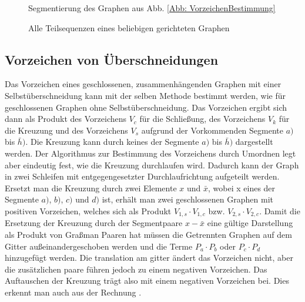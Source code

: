 \begin{figure}
    \begin{subfigure}[c]{0.3\textwidth}
    
    \end{subfigure}
    \hspace{0.2\textwidth}
    \begin{subfigure}[c]{0.3\textwidth}
    
    \end{subfigure}
    \caption{Segmentierung des Graphen aus Abb. \ref{Abb: VorzeichenBestimmung}}
    \label{Abb: Segmentierung}
\end{figure}

\begin{figure}[h!]
    \centering
    
    \caption{Alle Teilsequenzen eines beliebigen gerichteten Graphen }
    \label{Abb: directedElemets}
\end{figure}


\subsection{Vorzeichen von Überschneidungen}

Das Vorzeichen eines geschlossenen, zusammenhängenden Graphen mit einer Selbstüberschneidung kann mit der selben Methode bestimmt werden, wie für geschlossenen Graphen ohne Selbstüberschneidung. Das Vorzeichen ergibt sich dann als Produkt des Vorzeichens $V_c$ für die Schließung, des Vorzeichens $V_k$ für die Kreuzung und des Vorzeichens $V_s$ aufgrund der Vorkommenden Segmente $a)$ bis $\bar h)$. Die Kreuzung kann durch keines der Segmente $a)$ bis $\bar h)$ dargestellt werden. Der Algorithmus zur Bestimmung des Vorzeichens durch Umordnen legt aber eindeutig fest, wie die Kreuzung durchlaufen wird. Dadurch kann der Graph in zwei Schleifen mit entgegengesetzter Durchlaufrichtung aufgeteilt werden. Ersetzt man die Kreuzung durch zwei Elemente $x$ und $\bar x$, wobei x eines der Segmente  $a)$, $b)$, $c)$ und $d)$ ist, erhält man zwei geschlossenen Graphen mit positiven Vorzeichen, welches sich als Produkt $V_{1,s}\cdot V_{1,c}$ bzw. $V_{2,s}\cdot V_{2,c}$. Damit die Ersetzung der Kreuzung durch der Segmentpaare $x-\bar x$ eine gültige Darstellung als Produkt von Graßman Paaren hat müssen die Getrennten Graphen auf dem Gitter außeinandergeschoben werden und die Terme $P_a \cdot P_b$ oder $P_c \cdot P_d$ hinzugefügt werden. Die translation am gitter ändert das Vorzeichen nicht, aber die zusätzlichen paare führen jedoch zu einem negativen Vorzeichen. Das Auftauschen der Kreuzung trägt also mit einem negativen Vorzeichen bei. Dies erkennt man auch aus der Rechnung . 

